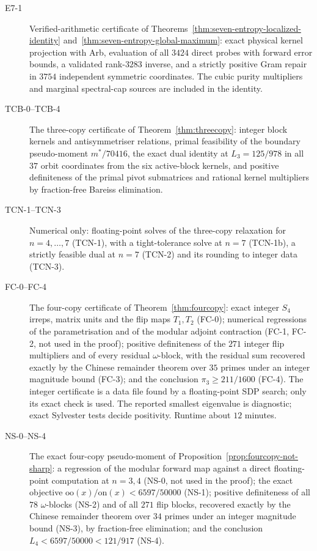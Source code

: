 \begin{description}
\item[E7-1] Verified-arithmetic certificate of Theorems~\ref{thm:seven-entropy-localized-identity}
and~\ref{thm:seven-entropy-global-maximum}: exact physical kernel projection with Arb, evaluation of all
$3424$ direct probes with forward error bounds, a validated rank-$3283$ inverse, and a strictly positive
Gram repair in $3754$ independent symmetric coordinates.
The cubic purity multipliers and marginal spectral-cap sources are included in the identity.
\item[TCB-0--TCB-4] The three-copy certificate of Theorem~\ref{thm:threecopy}: integer block kernels and
antisymmetriser relations, primal feasibility of the boundary pseudo-moment $m^*/70416$, the exact dual identity
at $L_3=125/978$ in all $37$ orbit coordinates from the six active-block kernels, and positive definiteness
of the primal pivot submatrices and rational kernel multipliers by fraction-free Bareiss elimination.
\item[TCN-1--TCN-3] Numerical only: floating-point solves of the three-copy relaxation for $n=4,\ldots,7$ (TCN-1),
with a tight-tolerance solve at $n=7$ (TCN-1b), a strictly feasible dual at $n=7$ (TCN-2) and its rounding to
integer data (TCN-3).
\item[FC-0--FC-4] The four-copy certificate of Theorem~\ref{thm:fourcopy}: exact integer $S_4$ irreps,
matrix units and the flip maps $T_1,T_2$ (FC-0); numerical regressions of the parametrisation and of the
modular adjoint contraction (FC-1, FC-2, not used in the proof); positive definiteness of the $271$ integer
flip multipliers and of every residual $\omega$-block, with the residual sum recovered exactly by the
Chinese remainder theorem over $35$ primes under an integer magnitude bound (FC-3); and the conclusion $\pi_3\ge211/1600$ (FC-4). The
integer certificate is a data file found by a floating-point SDP search; only its exact check is used.
The reported smallest eigenvalue is diagnostic; exact Sylvester tests decide positivity.
Runtime about $12$ minutes.
\item[NS-0--NS-4] The exact four-copy pseudo-moment of Proposition~\ref{prop:fourcopy-not-sharp}: a regression of
the modular forward map against a direct floating-point computation at $n=3,4$ (NS-0, not used in the proof); the
exact objective $\mathrm{oo}(x)/\mathrm{on}(x)<6597/50000$ (NS-1); positive definiteness of all $78$ $\omega$-blocks
(NS-2) and of all $271$ flip blocks, recovered exactly by the Chinese remainder theorem over $34$ primes under an
integer magnitude bound (NS-3), by fraction-free elimination; and the conclusion $L_4<6597/50000<121/917$ (NS-4).

\end{description}
